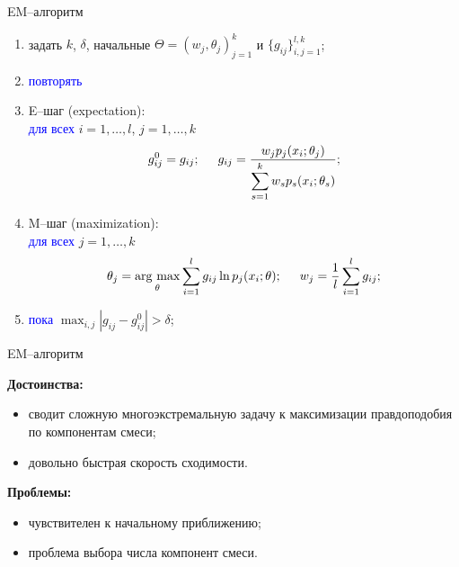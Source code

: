 \documentclass[unicode, notheorems, pdf]{beamer}
\DeclareMathOperator*{\argmax}{arg\,\max}
\begin{document}
\begin{frame}{EM--алгоритм}
	\begin{enumerate}
		\item задать $k$, $\delta$, начальные $\Theta=(w_j,\theta_j)_{j=1}^k$ и $\{g_{ij}\}_{i,j=1}^{l,k}$;
		\item\textcolor{blue}{повторять}
		\item\hspace{.5cm}E--шаг (expectation):\\
		\hspace{.5cm}\textcolor{blue}{для всех} $i=1,\dots,l$, $j=1,\dots,k$
		\[g_{ij}^0=g_{ij};\hspace{.5cm}g_{ij}=\frac{w_jp_j(x_i;\theta_j)}{\displaystyle\sum_{s=1}^kw_sp_s(x_i;\theta_s)};\]
		\item\hspace{.5cm}M--шаг (maximization):\\
		\hspace{.5cm}\textcolor{blue}{для всех} $j=1,\dots,k$
		\[\theta_j=\argmax_{\theta}\sum_{i=1}^lg_{ij}\ln p_j(x_i;\theta);\hspace{.5cm}w_j=\frac{1}{l}\sum_{i=1}^lg_{ij};\]
		\item \textcolor{blue}{пока} $\max_{i,j}|g_{ij}-g_{ij}^0|>\delta$;
	\end{enumerate}
\end{frame}

\begin{frame}{EM--алгоритм}

	{\bf Достоинства:}
	\vspace{.25cm}
	\begin{itemize}
		\item сводит сложную многоэкстремальную задачу к максимизации правдоподобия по компонентам смеси;
		\vspace{.25cm}
		\item довольно быстрая скорость сходимости.
	\end{itemize}

	\vspace{1cm}
	{\bf Проблемы:}
	\vspace{.25cm}
	\begin{itemize}
		\item чувствителен к начальному приближению;
		\vspace{.25cm}
		\item проблема выбора числа компонент смеси.
	\end{itemize}
\end{frame}
\end{document}
